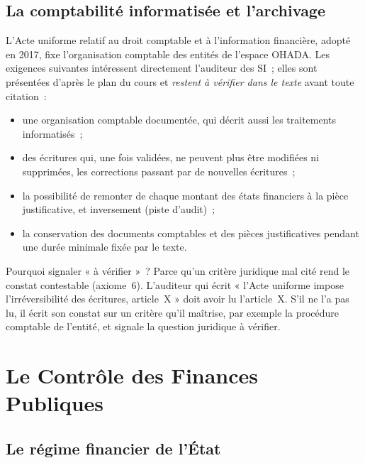 \subsection{La comptabilité informatisée et l'archivage}

L'Acte uniforme relatif au droit comptable et à l'information financière,
adopté en 2017, fixe l'organisation comptable des entités de l'espace
OHADA. Les exigences suivantes intéressent directement l'auditeur des SI~;
elles sont présentées d'après le plan du cours et \emph{restent à vérifier
dans le texte} avant toute citation~:
\begin{itemize}
    \item une organisation comptable documentée, qui décrit aussi les
          traitements informatisés~;
    \item des écritures qui, une fois validées, ne peuvent plus être
          modifiées ni supprimées, les corrections passant par de nouvelles
          écritures~;
    \item la possibilité de remonter de chaque montant des états financiers
          à la pièce justificative, et inversement (piste d'audit)~;
    \item la conservation des documents comptables et des pièces
          justificatives pendant une durée minimale fixée par le texte.
\end{itemize}

\begin{boiteRemarque}{Pourquoi signaler « à vérifier »~?}
Parce qu'un critère juridique mal cité rend le constat contestable
(axiome~6). L'auditeur qui écrit « l'Acte uniforme impose
l'irréversibilité des écritures, article~X » doit avoir lu l'article~X.
S'il ne l'a pas lu, il écrit son constat sur un critère qu'il maîtrise,
par exemple la procédure comptable de l'entité, et signale la question
juridique à vérifier.
\end{boiteRemarque}

\section{Le Contrôle des Finances Publiques}
\label{sec:c15-public}

\subsection{Le régime financier de l'État}

